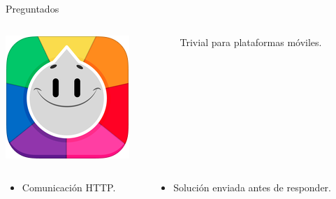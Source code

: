 \begin{frame}{Preguntados}
\begin{columns}
    \begin{column}{0.15\textwidth}
        \includegraphics[width=\textwidth,keepaspectratio]{imgs/preguntados_logo.png}
    \end{column}
    \begin{column}{0.85\textwidth}
        Trivial para plataformas móviles.
    \end{column}
\end{columns}

\begin{columns}
    \begin{column}{0.5\textwidth}
    \begin{itemize}
        \item<2-> Comunicación HTTP.
    \end{itemize}
    \end{column}

    \begin{column}{0.5\textwidth}
    \begin{itemize}
        \item<3-> Solución enviada antes de responder.
    \end{itemize}
    \end{column}
\end{columns}


\end{frame}


